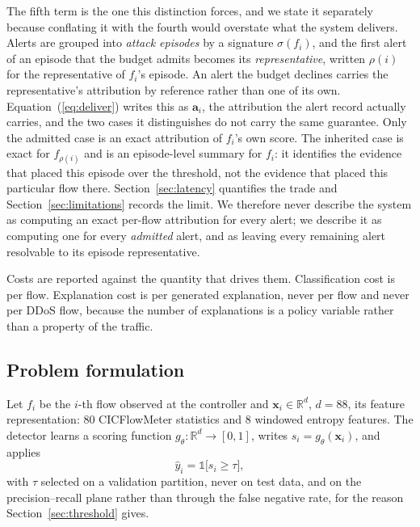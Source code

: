 \documentclass{ieeeaccess}
\begin{document}
The fifth term is the one this distinction forces, and we state it separately
because conflating it with the fourth would overstate what the system delivers.
Alerts are grouped into \emph{attack episodes} by a signature $\sigma(f_i)$, and
the first alert of an episode that the budget admits becomes its
\emph{representative}, written $\rho(i)$ for the representative of $f_i$'s
episode. An alert the budget declines carries the representative's attribution by
reference rather than one of its own. Equation~(\ref{eq:deliver}) writes this as
$\mathbf{a}_i$, the attribution the alert record actually carries, and the two
cases it distinguishes do not carry the same guarantee. Only the admitted case is
an exact attribution of $f_i$'s own score. The inherited case is exact for
$f_{\rho(i)}$ and is an episode-level summary for $f_i$: it identifies the
evidence that placed this episode over the threshold, not the evidence that
placed this particular flow there. Section~\ref{sec:latency} quantifies the trade
and
Section~\ref{sec:limitations} records the limit. We therefore never describe the
system as computing an exact per-flow attribution for every alert; we describe it
as computing one for every \emph{admitted} alert, and as leaving every remaining
alert resolvable to its episode representative.

Costs are reported against the quantity that drives them. Classification cost is
per flow. Explanation cost is per generated explanation, never per flow and never
per DDoS flow, because the number of explanations is a policy variable rather
than a property of the traffic.

\subsection{Problem formulation}
Let $f_i$ be the $i$-th flow observed at the controller and
$\mathbf{x}_i \in \mathbb{R}^{d}$, $d = 88$, its feature representation: $80$
CICFlowMeter statistics and $8$ windowed entropy features. The detector learns a
scoring function $g_{\theta}\colon \mathbb{R}^{d} \to [0,1]$, writes
$s_i = g_{\theta}(\mathbf{x}_i)$, and applies
\begin{equation}
\hat{y}_i = \mathbb{1}\bigl[s_i \geq \tau\bigr],
\label{eq:decision}
\end{equation}
with $\tau$ selected on a validation partition, never on test data, and on the
precision--recall plane rather than through the false negative rate, for the
reason Section~\ref{sec:threshold} gives.
\end{document}
